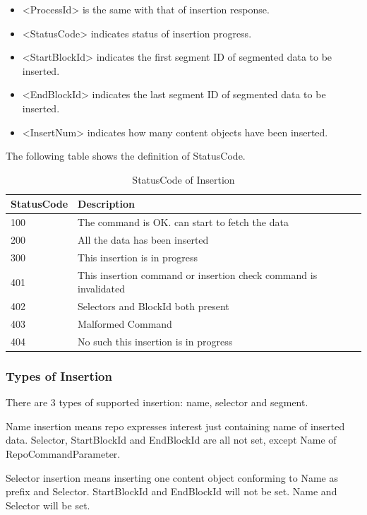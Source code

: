 \documentclass{acm_proc_article-sp}
\begin{document}
\begin{itemize}
\item <ProcessId> is the same with that of insertion response.
\item <StatusCode> indicates status of insertion progress.
\item <StartBlockId> indicates the first segment ID of segmented data to be inserted.
\item <EndBlockId> indicates the last segment ID of segmented data to be inserted.
\item <InsertNum> indicates how many content objects have been inserted.
\end{itemize}

The following table shows the definition of StatusCode.

\begin{table}[!hbp]
\centering

\begin{tabular}{l l}

\hline
StatusCode & Description \\
\hline
100 & The command is OK. can start to fetch the data \\
200 & All the data has been inserted \\
300 & This insertion is in progress \\
401 & This insertion command or insertion check command is invalidated \\
402 & Selectors and BlockId both present\\
403 & Malformed Command \\
404 & No such this insertion is in progress \\
\hline

\end{tabular}
\caption{StatusCode of Insertion}
\end{table}

\subsubsection{Types of Insertion}
There are 3 types of supported insertion: name, selector and segment.

Name insertion means repo expresses interest just containing name of inserted data. Selector, StartBlockId and EndBlockId are all not set, except Name of RepoCommandParameter.

Selector insertion means inserting one content object conforming to Name as prefix and Selector. StartBlockId and EndBlockId will not be set. Name and Selector will be set.
\end{document}
